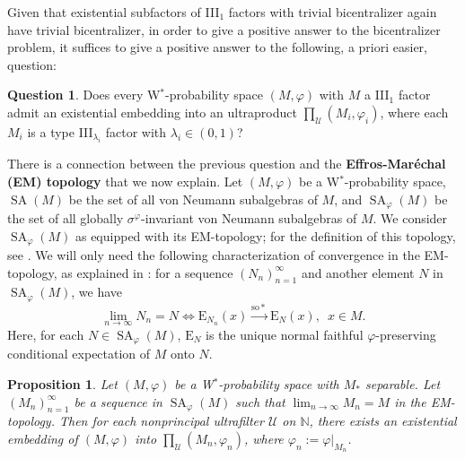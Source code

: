 \documentclass[12pt]{amsart}
\newtheorem{prop}[thm]{Proposition}
\theoremstyle{definition}
\newtheorem{question}[thm]{Question}
\newcommand{\N}{\mathbb{N}}
\newcommand{\E}{\mathrm{E}}
\def\cal{\mathcal}
\def\u{\mathsf 1}
\newcommand{\SA}{\operatorname{SA}}
\newcommand\cU{{\cal U}}
\def \u{\mathcal U}
\begin{document}
Given that existential subfactors of III$_1$ factors with trivial bicentralizer again have trivial bicentralizer, in order to give a positive answer to the bicentralizer problem, it suffices to give a positive answer to the following, a priori easier, question:

\begin{question}
Does every W$^*$-probability space $(M,\varphi)$ with $M$ a III$_1$ factor admit an existential embedding into an ultraproduct $\prod_\u (M_i,\varphi_i)$, where each $M_i$ is a type III$_{\lambda_i}$ factor with $\lambda_i\in (0,1)$? 
\end{question}

There is a connection between the previous question and the \textbf{Effros-Mar\'echal (EM) topology} that we now explain.  Let $(M,\varphi)$ be a W$^*$-probability space, $\SA(M)$ be the set of all von Neumann subalgebras of $M$, and $\SA_{\varphi}(M)$ be the set of all globally $\sigma^{\varphi}$-invariant von Neumann subalgebras of $M$. 
We consider $\SA_\varphi(M)$ as equipped with its EM-topology; for the definition of this topology, see \cite[Section 2]{HW98}. We will only need the following characterization of convergence in the EM-topology, as explained in \cite[page 575]{HW98}: for a sequence $(N_n)_{n=1}^{\infty}$ and another element $N$ in $\SA_{\varphi}(M)$, we have
\[\lim_{n\to \infty}N_n=N\iff \E_{N_n}(x)\xrightarrow{\mathrm{so*}}\E_N(x),\,\,\,x\in M.\]
Here, for each $N\in \SA_{\varphi}(M)$, $\E_N$ is the unique normal faithful $\varphi$-preserving conditional expectation of $M$ onto $N$.
\begin{prop}\label{prop EM implies existential emb}
Let $(M,\varphi)$ be a W$^*$-probability space with $M_*$ separable. Let $(M_n)_{n=1}^{\infty}$ be a sequence in $\SA_{\varphi}(M)$ such that $\displaystyle \lim_{n\to \infty}M_n=M$ in the EM-topology. 
Then for each nonprincipal ultrafilter $\cU$ on $\N$, there exists an existential embedding of $(M,\varphi)$ into $\prod_{\cU}(M_n,\varphi_n)$, where $\varphi_n:=\varphi|_{M_n}$. 
\end{prop}
\end{document}
